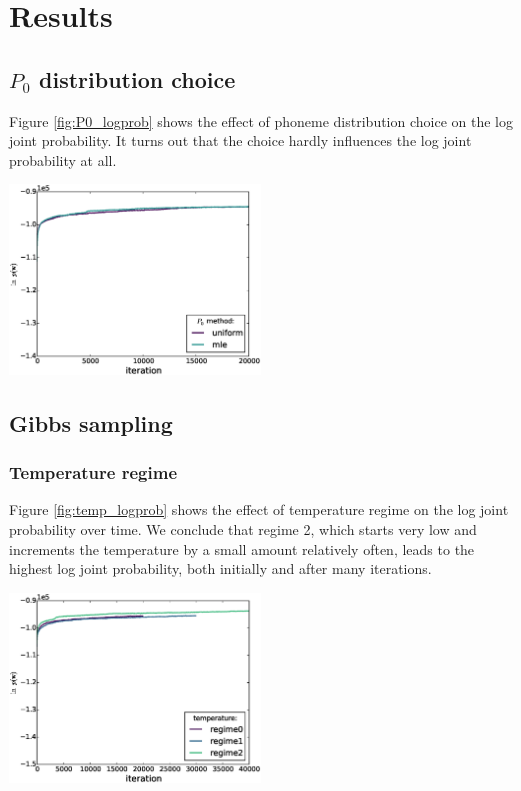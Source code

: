 \section{Results}

\subsection{$P_0$ distribution choice}

Figure \ref{fig:P0_logprob} shows the effect of phoneme distribution choice on the log joint probability. It turns out that the choice hardly influences the log joint probability at all.

\begingroup
    \centering
    \includegraphics[width=0.5\textwidth]{images/P0_method-log_prob}
    \label{fig:P0_logprob}
\endgroup

\subsection{Gibbs sampling}

\subsubsection{Temperature regime}

Figure \ref{fig:temp_logprob} shows the effect of temperature regime on the log joint probability over time. We conclude that regime 2, which starts very low and increments the temperature by a small amount relatively often, leads to the highest log joint probability, both initially and after many iterations.

\begingroup
    \centering
    \includegraphics[width=0.5\textwidth]{images/temperature-log_prob}
	\label{fig:temp_logprob}
\endgroup

